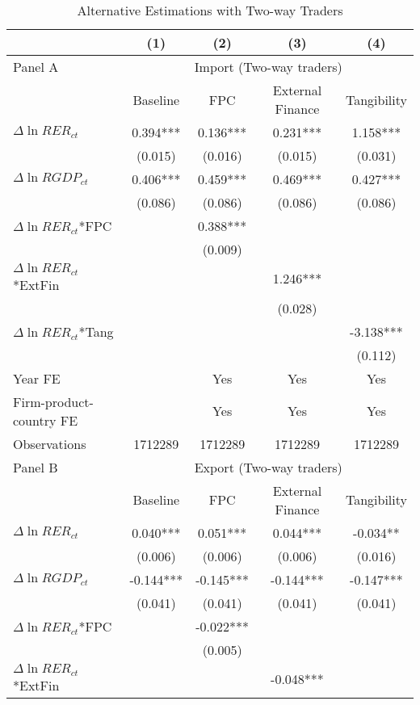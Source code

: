 \begin{table}[htbp]
	\centering
	\caption{Alternative Estimations with Two-way Traders}
	\begin{threeparttable}
	\begin{tabular}{lcccc}
		\toprule
		& (1)   & (2)   & (3)   & (4) \\
		\midrule
		Panel A & \multicolumn{4}{c}{Import (Two-way traders)} \\
		& Baseline & FPC   & External Finance & Tangibility \\
		\midrule
		$\Delta \ln RER_{ct}$ & 0.394*** & 0.136*** & 0.231*** & 1.158*** \\
		& (0.015) & (0.016) & (0.015) & (0.031) \\
		$\Delta \ln RGDP_{ct}$ & 0.406*** & 0.459*** & 0.469*** & 0.427*** \\
		& (0.086) & (0.086) & (0.086) & (0.086) \\
		$\Delta \ln RER_{ct}$*FPC &       & 0.388*** &       &  \\
		&       & (0.009) &       &  \\
		$\Delta \ln RER_{ct}$*ExtFin &       &       & 1.246*** &  \\
		&       &       & (0.028) &  \\
		$\Delta \ln RER_{ct}$*Tang &       &       &       & -3.138*** \\
		&       &       &       & (0.112) \\
		Year FE  &       & Yes   & Yes   & Yes \\
		Firm-product-country FE &       & Yes   & Yes   & Yes \\
		Observations & 1712289 & 1712289 & 1712289 & 1712289 \\
		Panel B & \multicolumn{4}{c}{Export (Two-way traders)} \\
		& Baseline & FPC   & External Finance & Tangibility \\
		\midrule
		$\Delta \ln RER_{ct}$ & 0.040*** & 0.051*** & 0.044*** & -0.034** \\
		& (0.006) & (0.006) & (0.006) & (0.016) \\
		$\Delta \ln RGDP_{ct}$ & -0.144*** & -0.145*** & -0.144*** & -0.147*** \\
		& (0.041) & (0.041) & (0.041) & (0.041) \\
		$\Delta \ln RER_{ct}$*FPC &       & -0.022*** &       &  \\
		&       & (0.005) &       &  \\
		$\Delta \ln RER_{ct}$*ExtFin &       &       & -0.048*** &  \\

\end{tabular}
\end{threeparttable}
\end{table}
